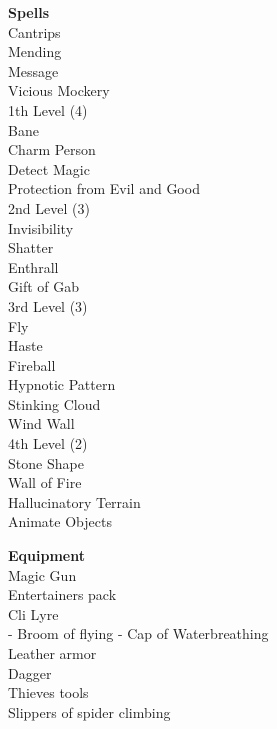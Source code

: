\documentclass[11pt]{article}
\begin{document}
\begin{minipage}[t]{.5\textwidth}
{\huge \textbf{\Fontauri Spells}}\\
\textcolor{OCRA}{Cantrips}\\
Mending\\
Message\\
Vicious Mockery\\
\textcolor{OCRA}{1th Level (4)}\\
Bane \\
Charm Person\\
Detect Magic\\
Protection from Evil and Good\\
\textcolor{OCRA}{2nd Level (3)}\\
Invisibility\\
Shatter\\
Enthrall\\
Gift of Gab\\
\textcolor{OCRA}{3rd Level (3)}\\
Fly\\
Haste\\
Fireball\\
Hypnotic Pattern\\
Stinking Cloud\\
Wind Wall\\
\textcolor{OCRA}{4th Level (2)}\\
Stone Shape\\
Wall of Fire\\
Hallucinatory Terrain\\
Animate Objects
\end{minipage}
\begin{minipage}[t]{.4\textwidth}\raggedleft
{\Large \textbf{ \Fontauri Equipment}}\\
Magic Gun \\
Entertainers pack\\
Cli Lyre\\ - Broom of flying - Cap of Waterbreathing\\
Leather armor \\
Dagger\\
Thieves tools\\
Slippers of spider climbing\\

\end{minipage}
\end{document}
